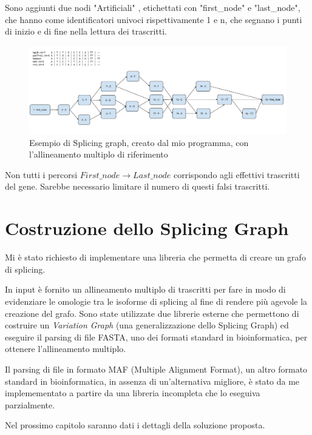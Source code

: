 Sono aggiunti due nodi "Artificiali" , etichettati con "first\_node" e "last\_node", che hanno come identificatori univoci rispettivamente 1 e n, che segnano i punti di inizio e di fine nella lettura dei trascritti.

\begin{figure}[ht]
    \centering
    \includegraphics[scale=0.55]{images/Spling graph example.PNG}
    \caption{Esempio di Splicing graph, creato dal mio programma, con l'allineamento multiplo di riferimento}
    \label{fig:slicing_graph_example}
\end{figure}

Non tutti i percorsi $First\_node \to Last\_node$ corrispondo agli effettivi trascritti del gene. Sarebbe necessario limitare il numero di questi falsi trascritti.

\section{Costruzione dello Splicing Graph}
Mi è stato richiesto di implementare una libreria che permetta di creare un grafo di splicing.

In input è fornito un allineamento multiplo di trascritti per fare in modo di evidenziare le omologie tra le isoforme di splicing al fine di rendere più agevole la creazione del grafo. Sono state utilizzate due librerie esterne che permettono di costruire un \textit{Variation Graph} (una generalizzazione dello Splicing Graph) ed eseguire il parsing di file FASTA, uno dei formati standard in bioinformatica, per ottenere l'allineamento multiplo. 

Il parsing di file in formato MAF (Multiple Alignment Format), un altro formato standard in bioinformatica, in assenza di un'alternativa migliore, è stato da me implemementato a partire da una libreria incompleta che lo eseguiva parzialmente.

Nel prossimo capitolo saranno dati i dettagli della soluzione proposta.